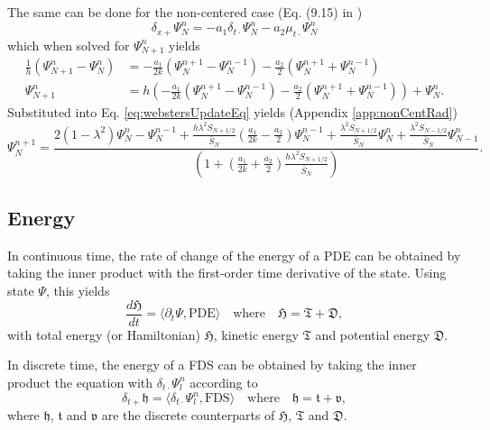 \documentclass[dvipsnames]{article}
\def\Psiln{\Psi_l^n}
\def\dtd{\delta_{t\cdot}}
\begin{document}
The same can be done for the non-centered case (Eq. (9.15) in \cite{Bilbao2009})
\begin{equation}\label{eq:nonCentRadBound}
    \delta_{x+}\Psi_N^n = -a_1\dtd\Psi_N^n - a_2\mu_{t\cdot}\Psi_N^n
\end{equation}
which when solved for $\Psi_{N+1}^n$ yields
\begin{align}
    \frac{1}{h}(\Psi_{N+1}^n - \Psi_{N}^n) &= -\frac{a_1}{2k}(\Psi_N^{n+1} - \Psi_N^{n-1}) - \frac{a_2}{2}(\Psi_N^{n+1} + \Psi_N^{n-1})\nonumber\\
        \Psi_{N+1}^n &= h\left(-\frac{a_1}{2k}(\Psi_N^{n+1} - \Psi_N^{n-1}) - \frac{a_2}{2}(\Psi_N^{n+1} + \Psi_N^{n-1})\right) + \Psi_{N}^n.
\end{align}
Substituted into Eq. \eqref{eq:webstersUpdateEq} yields (Appendix \ref{app:nonCentRad})
\begin{equation}
    \Psi_N^{n+1} = \frac{2(1-\lambda^2)\Psi_N^n-\Psi_N^{n-1}+\frac{h\lambda^2S_{N+1/2}}{\bar S_N}\left(\frac{a_1}{2k}-\frac{a_2}{2}\right)\Psi_N^{n-1} + \frac{\lambda^2S_{N+1/2}}{\bar S_N}\Psi_{N}^n + \frac{\lambda^2S_{N-1/2}}{\bar S_N}\Psi_{N-1}^n}{\left(1+\left(\frac{a_1}{2k}+\frac{a_2}{2}\right)\frac{h\lambda^2S_{N+1/2}}{\bar S_N}\right)}.
\end{equation}

\subsection{Energy}
In continuous time, the rate of change of the energy of a PDE can be obtained by taking the inner product with the first-order time derivative of the state. Using state $\Psi$, this yields
\begin{equation}
    \frac{d\mathfrak{H}}{dt} = \langle \partial_t\Psi, \text{PDE} \rangle\quad \text{where} \quad \mathfrak{H} = \mathfrak{T} + \mathfrak{D},
\end{equation}
with total energy (or Hamiltonian) $\mathfrak{H}$, kinetic energy $\mathfrak{T}$ and potential energy $\mathfrak{D}$.

In discrete time, the energy of a FDS can be obtained by taking the inner product the equation with $\dtd\Psiln$ according to 
\begin{equation}\label{eq:energyForm}
    \delta_{t+}\mathfrak{h} = \langle \dtd\Psiln,\text{FDS}\rangle \quad \text{where} \quad \mathfrak{h} = \mathfrak{t} + \mathfrak{v},
\end{equation}
where $\mathfrak{h}$, $\mathfrak{t}$ and $\mathfrak{v}$ are the discrete counterparts of $\mathfrak{H}$, $\mathfrak{T}$ and $\mathfrak{D}$.
\end{document}
